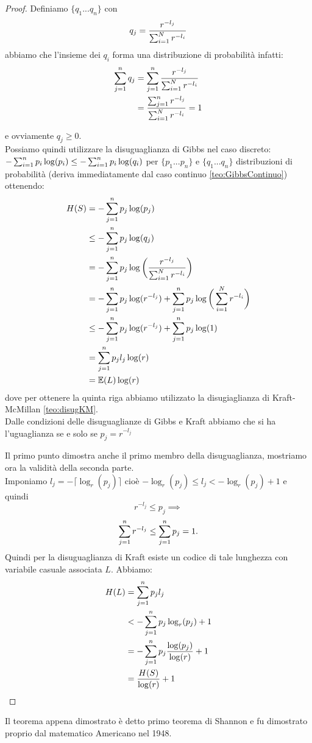 \begin{proof}
\item Definiamo $\{q_1...q_n \}$ con
\begin{equation}
q_j=\frac{r^{-l_j}}{\sum_{i=1}^N r^{-l_i}}
\end{equation}
abbiamo che l'insieme dei $q_i$ forma una distribuzione di probabilità infatti:
\[
\begin{split}
\sum_{j=1}^n q_j& = \sum_{j=1}^n \frac{r^{-l_j}}{\sum_{i=1}^N r^{-l_i}}\\
&= \frac{\sum_{j=1}^n  r^{-l_j}}{\sum_{i=1}^N r^{-l_i}} =1
\end{split}
\]

e ovviamente $q_j\geq 0$.\\
Possiamo quindi utilizzare la disuguaglianza di Gibbs nel caso discreto: $- \sum_{i=1}^n p_i \log(p_i) \leq - \sum_{i=1}^n p_i \log(q_i)$ per $\{p_1...p_n \}$ e $\{q_1...q_n \}$ distribuzioni di probabilità (deriva immediatamente dal caso continuo \ref{teo:GibbsContinuo}) ottenendo:
\[
\begin{split}
H(S)& = - \sum_{j=1}^n p_j \log(p_j) \\
& \leq  - \sum_{j=1}^n p_j \log(q_j)\\
& =  - \sum_{j=1}^n p_j \log \bigg(\frac{r^{-l_j}}{\sum_{i=1}^N r^{-l_i}} \bigg)\\
& =  - \sum_{j=1}^n p_j \log ( r^{-l_j}) +\sum_{j=1}^n p_j \log \bigg( \sum_{i=1}^N r^{-l_i} \bigg)\\
& \leq - \sum_{j=1}^n p_j \log ( r^{-l_j}) +\sum_{j=1}^n p_j \log (1)\\
& =\sum_{j=1}^n p_j l_j \log ( r)\\
&= \mathbb{E}(L)\log (r)
\end{split}
\]
dove per ottenere la quinta riga abbiamo utilizzato la disugiaglianza di Kraft-McMillan \ref{teo:disugKM}.\\
Dalle condizioni delle disuguaglianze di Gibbs e Kraft abbiamo che si ha l'uguaglianza se e solo se $p_j=r^{-l_j}$
\item  Il primo punto dimostra anche il primo membro della disuguaglianza, mostriamo ora la validità della seconda parte.\\
Imponiamo $l_j =  -\lceil \log_r(p_j) \rceil$ cioè  $- \log_r(p_j) \leq l_j < - \log_r(p_j) +1$ e quindi 
$$r^{-l_j} \leq p_j \implies $$ 
$$  \sum_{j=1}^n r^{-l_j} \leq \sum_{j=1}^n p_j=1.$$
Quindi per la disuguaglianza di Kraft esiste un codice di tale lunghezza con variabile casuale associata $L$. Abbiamo:
\[
\begin{split}
H(L)& =  \sum_{j=1}^n p_j l_j \\
& <   - \sum_{j=1}^n p_j  \log_r(p_j) +1\\
& = - \sum_{j=1}^n p_j  \frac{\log(p_j)}{\log(r)} +1 \\
& =  \frac{H(S)}{ \log (r)} +1
\end{split}
\]
\end{proof}
Il teorema appena dimostrato è detto primo teorema di Shannon e fu dimostrato proprio dal matematico Americano nel 1948.\\



